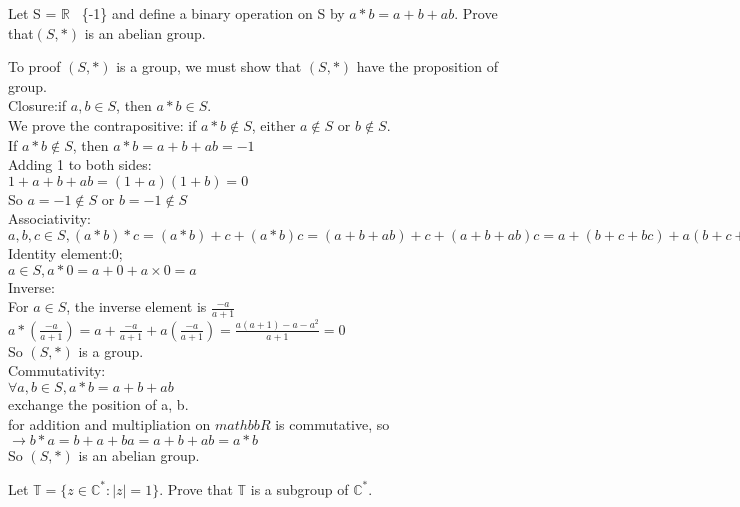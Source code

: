 \documentclass[a4paper, justified]{tufte-handout}
\begin{document}
\begin{problem}[TJ-3-7]
Let S = $\mathbb{R}$ \ \{-1\} and define a binary operation on S by $a * b = a+b+ab.$ Prove that$(S, *)$ is an abelian group.
\end{problem}

\begin{solution}
	To proof $(S,*)$ is a group, we must show that $(S,*)$ have the proposition of group.\\
	Closure:if $a,b\in S$, then $a*b \in S$.\\
	We prove the contrapositive: if $a*b \notin S$, either $a\notin S$ or $b\notin S$.\\
	If $a*b \notin S$, then $a*b = a+b+ab=-1$\\
	Adding 1 to both sides:\\
	$1+a+b+ab=(1+a)(1+b)=0$\\
	So $a=-1\notin S$ or $b=-1\notin S$\\
	Associativity:\\
	$a,b,c\in S, (a*b)*c=(a*b)+c+(a*b)c=(a+b+ab)+c+(a+b+ab)c=a+(b+c+bc)+a(b+c+bc)=a+(b*c)+a(b*c)=a*(b*c)$\\
	Identity element:0;\\
	$a\in S, a*0=a+0+a\times 0 = a$\\
	Inverse:\\
	For $a\in S$, the inverse element is $\frac{-a}{a+1}$\\
	$a *\left(\frac{-a}{a+1}\right)=a+\frac{-a}{a+1}+a\left(\frac{-a}{a+1}\right)=\frac{a(a+1)-a-a^2}{a+1}=0$\\
	So $(S,*)$ is a group.\\
	Commutativity:\\
	$\forall a,b \in S, a * b=a+b+ab$\\
	exchange the position of a, b.\\
	for addition and multipliation on $mathbb{R}$ is commutative, so $\rightarrow b*a=b+a+ba = a+b+ab = a*b$\\
	So $(S,*)$ is an abelian group.
\end{solution}

\begin{problem}[TJ 3-39]
Let $\mathbb{T} = \{z\in \mathbb{C}^*:|z|=1\}$. Prove that $\mathbb{T}$ is a subgroup of $\mathbb{C}^*$.
\end{problem}
\end{document}
